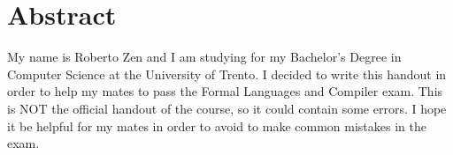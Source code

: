 \chapter*{Abstract}
My name is Roberto Zen and I am studying for my Bachelor’s Degree in Computer Science at the University of Trento.
I decided to write this handout in order to help my mates to pass the Formal Languages and Compiler exam. This is NOT the official handout of the course, so it could contain some errors.
I hope it be helpful for my mates in order to avoid to make common mistakes in the exam.
